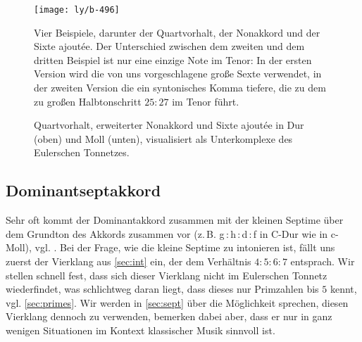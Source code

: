 
\begin{figure}
  \centering
  \texttt{[image: ly/b-496]}
  \caption{Vier Beispiele, darunter der Quartvorhalt, der Nonakkord und der
    Sixte ajoutée. Der Unterschied zwischen dem zweiten und dem dritten Beispiel
    ist nur eine einzige Note im Tenor: In der ersten Version wird die von uns
    vorgeschlagene große Sexte verwendet, in der zweiten Version die ein
    syntonisches Komma tiefere, die zu dem zu großen Halbtonschritt $25:27$
    im Tenor führt.}\label{fig:496}
\end{figure}

\begin{figure}
  \centering
  
  \caption{Quartvorhalt, erweiterter Nonakkord und Sixte ajoutée in Dur (oben)
    und Moll (unten), visualisiert als Unterkomplexe des Eulerschen
    Tonnetzes.}\label{fig:chordLines}
\end{figure}

\subsection{Dominantseptakkord}
\label{sec:dom7syn}

Sehr oft kommt der Dominantakkord zusammen mit der kleinen Septime über dem
Grundton des Akkords zusammen vor (z.\,B. g\,:\,h\,:\,d\,:\,f in C-Dur wie in
c-Moll), vgl. \cite[{}9.1]{Skript}.  Bei der Frage, wie die kleine Septime zu
intonieren ist, fällt uns zuerst der Vierklang aus \cref{sec:int} ein, der dem
Verhältnis $4:5:6:7$ entsprach. Wir stellen schnell fest, dass sich dieser
Vierklang nicht im Eulerschen Tonnetz wiederfindet, was schlichtweg daran liegt,
dass dieses nur Primzahlen bis $5$ kennt, vgl. \cref{sec:primes}.  Wir werden in
\cref{sec:sept} über die Möglichkeit sprechen, diesen Vierklang dennoch zu
verwenden, bemerken dabei aber, dass er nur in ganz wenigen Situationen im
Kontext klassischer Musik sinnvoll ist.

